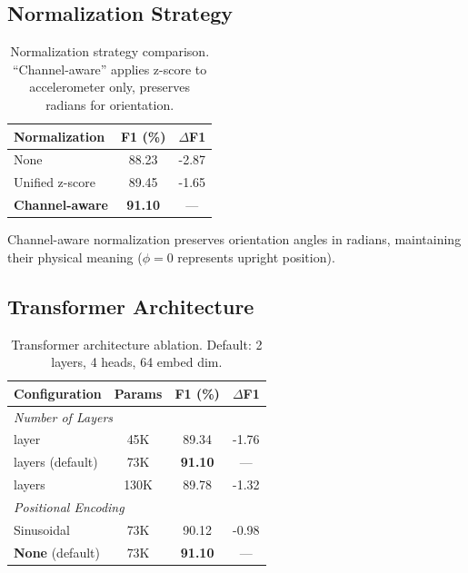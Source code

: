 \subsection{Normalization Strategy}
\label{app:normalization}

\begin{table}[H]
\caption{Normalization strategy comparison. ``Channel-aware'' applies z-score to accelerometer only, preserves radians for orientation.}
\label{tab:norm_ablation}
\centering
\begin{tabular}{lcc}
\toprule
\textbf{Normalization} & \textbf{F1 (\%)} & \textbf{$\Delta$F1} \\
\midrule
None & 88.23 & -2.87 \\
Unified z-score & 89.45 & -1.65 \\
\textbf{Channel-aware} & \textbf{91.10} & --- \\
\bottomrule
\end{tabular}
\end{table}

Channel-aware normalization preserves orientation angles in radians, maintaining their physical meaning ($\phi = 0$ represents upright position).

\subsection{Transformer Architecture}
\label{app:architecture}

\begin{table}[H]
\caption{Transformer architecture ablation. Default: 2 layers, 4 heads, 64 embed dim.}
\label{tab:arch_ablation}
\centering
\begin{tabular}{lccc}
\toprule
\textbf{Configuration} & \textbf{Params} & \textbf{F1 (\%)} & \textbf{$\Delta$F1} \\
\midrule
\multicolumn{4}{l}{\textit{Number of Layers}} \\
\quad 1 layer & 45K & 89.34 & -1.76 \\
\quad 2 layers (default) & 73K & \textbf{91.10} & --- \\
\quad 4 layers & 130K & 89.78 & -1.32 \\
\midrule
\multicolumn{4}{l}{\textit{Positional Encoding}} \\
\quad Sinusoidal & 73K & 90.12 & -0.98 \\
\quad \textbf{None} (default) & 73K & \textbf{91.10} & --- \\
\bottomrule
\end{tabular}
\end{table}

